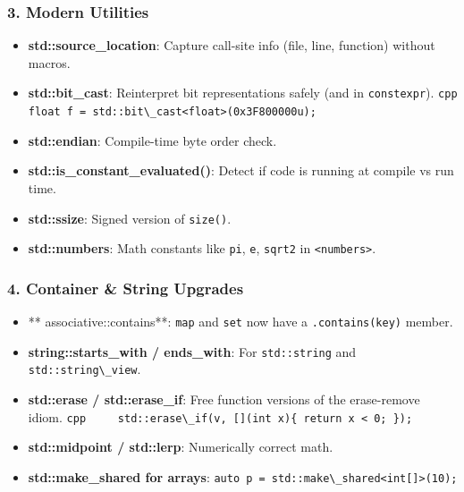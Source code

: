 \hypertarget{modern-utilities}{%
\subsubsection{3. Modern Utilities}\label{modern-utilities}}

\begin{itemize}
\tightlist
\item
  \textbf{std::source\_location}: Capture call-site info (file, line,
  function) without macros.
\item
  \textbf{std::bit\_cast}: Reinterpret bit representations safely (and
  in \passthrough{\lstinline!constexpr!}).
  \passthrough{\lstinline!cpp     float f = std::bit\_cast<float>(0x3F800000u);!}
\item
  \textbf{std::endian}: Compile-time byte order check.
\item
  \textbf{std::is\_constant\_evaluated()}: Detect if code is running at
  compile vs run time.
\item
  \textbf{std::ssize}: Signed version of
  \passthrough{\lstinline!size()!}.
\item
  \textbf{std::numbers}: Math constants like
  \passthrough{\lstinline!pi!}, \passthrough{\lstinline!e!},
  \passthrough{\lstinline!sqrt2!} in
  \passthrough{\lstinline!<numbers>!}.
\end{itemize}

\hypertarget{container-string-upgrades}{%
\subsubsection{4. Container \& String
Upgrades}\label{container-string-upgrades}}

\begin{itemize}
\tightlist
\item
  ** associative::contains**: \passthrough{\lstinline!map!} and
  \passthrough{\lstinline!set!} now have a
  \passthrough{\lstinline!.contains(key)!} member.
\item
  \textbf{string::starts\_with / ends\_with}: For
  \passthrough{\lstinline!std::string!} and
  \passthrough{\lstinline!std::string\_view!}.
\item
  \textbf{std::erase / std::erase\_if}: Free function versions of the
  erase-remove idiom.
  \passthrough{\lstinline!cpp     std::erase\_if(v, [](int x)\{ return x < 0; \});!}
\item
  \textbf{std::midpoint / std::lerp}: Numerically correct math.
\item
  \textbf{std::make\_shared for arrays}:
  \passthrough{\lstinline!auto p = std::make\_shared<int[]>(10);!}
\end{itemize}

